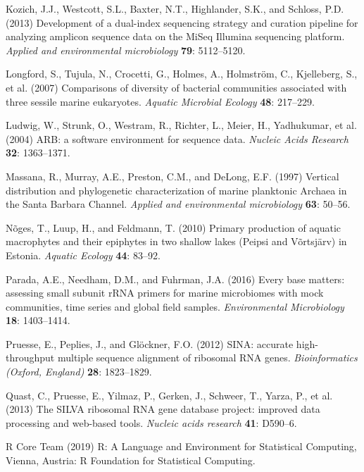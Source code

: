 \documentclass[12pt,]{article}
\begin{document}
\hypertarget{ref-Kozich2013}{}
Kozich, J.J., Westcott, S.L., Baxter, N.T., Highlander, S.K., and
Schloss, P.D. (2013) Development of a dual-index sequencing strategy and
curation pipeline for analyzing amplicon sequence data on the MiSeq
Illumina sequencing platform. \emph{Applied and environmental
microbiology} \textbf{79}: 5112--5120.

\hypertarget{ref-Longford2007}{}
Longford, S., Tujula, N., Crocetti, G., Holmes, A., Holmström, C.,
Kjelleberg, S., et al. (2007) Comparisons of diversity of bacterial
communities associated with three sessile marine eukaryotes.
\emph{Aquatic Microbial Ecology} \textbf{48}: 217--229.

\hypertarget{ref-Ludwig2004}{}
Ludwig, W., Strunk, O., Westram, R., Richter, L., Meier, H., Yadhukumar,
et al. (2004) ARB: a software environment for sequence data.
\emph{Nucleic Acids Research} \textbf{32}: 1363--1371.

\hypertarget{ref-Massana1997}{}
Massana, R., Murray, A.E., Preston, C.M., and DeLong, E.F. (1997)
Vertical distribution and phylogenetic characterization of marine
planktonic Archaea in the Santa Barbara Channel. \emph{Applied and
environmental microbiology} \textbf{63}: 50--56.

\hypertarget{ref-Noges2010}{}
Nõges, T., Luup, H., and Feldmann, T. (2010) Primary production of
aquatic macrophytes and their epiphytes in two shallow lakes (Peipsi and
Võrtsjärv) in Estonia. \emph{Aquatic Ecology} \textbf{44}: 83--92.

\hypertarget{ref-Parada2016}{}
Parada, A.E., Needham, D.M., and Fuhrman, J.A. (2016) Every base
matters: assessing small subunit rRNA primers for marine microbiomes
with mock communities, time series and global field samples.
\emph{Environmental Microbiology} \textbf{18}: 1403--1414.

\hypertarget{ref-Pruesse2012}{}
Pruesse, E., Peplies, J., and Glöckner, F.O. (2012) SINA: accurate
high-throughput multiple sequence alignment of ribosomal RNA genes.
\emph{Bioinformatics (Oxford, England)} \textbf{28}: 1823--1829.

\hypertarget{ref-Quast2013}{}
Quast, C., Pruesse, E., Yilmaz, P., Gerken, J., Schweer, T., Yarza, P.,
et al. (2013) The SILVA ribosomal RNA gene database project: improved
data processing and web-based tools. \emph{Nucleic acids research}
\textbf{41}: D590--6.

\hypertarget{ref-RCoreTeam2019}{}
R Core Team (2019) R: A Language and Environment for Statistical
Computing, Vienna, Austria: R Foundation for Statistical Computing.
\end{document}
